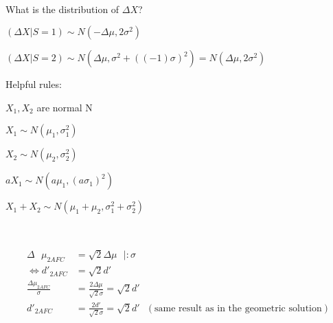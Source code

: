 \documentclass[../main/Notes.tex]{subfiles}
\begin{document}
\bigskip
\\
\begin{minipage}[t][3cm][t]{9.25cm}
What is the distribution of $\Delta X$?

$\left(\Delta X | S = 1\right) \sim N\left( -\Delta \mu , 2\sigma^{2}\right)$

$\left(\Delta X | S = 2\right) \sim N\left( \Delta \mu , \sigma^{2} + \left(\left( -1 \right)\sigma\right)^{2}\right) = N \left( \Delta \mu , 2\sigma^{2}\right)$
\end{minipage} 
\begin{minipage}[t][3cm][t]{6cm}
Helpful rules:

$X_{1},X_{2}$ are normal N

$X_{1} \sim N\left(\mu_{1} , \sigma_{1}^{2}\right)$

$X_{2} \sim N\left(\mu_{2} , \sigma_{2}^{2}\right)$

$aX_{1} \sim N\left(a\mu_{1} , \left(a\sigma_{1}\right)^{2}\right)$

$X_{1} + X_{2} \sim N \left( \mu_{1} + \mu_{2}, \sigma_{1}^{2} + \sigma_{2}^{2} \right)$
\end{minipage}
\\
\begin{minipage}[b][3cm][t]{3.5cm}
\end{minipage}
\begin{minipage}[b][3.5cm][t]{8cm}
\begin{align*}
& & \Delta ~~~\mu_{2AFC} & = \sqrt{2}\Delta\mu ~~~|:\sigma & &\\
& & \Leftrightarrow d'_{2AFC} & = \sqrt{2}d' & & \\
& & \frac{\Delta\mu_{2AFC}}{\sigma} & = \frac{2\Delta\mu}{\sqrt{2}\sigma} = \sqrt{2}d' & & \\
& & d'_{2AFC} & = \frac{2d'}{\sqrt{2}\sigma} = \sqrt{2}d' ~~~\left(\text{same result as in the geometric solution}\right) & &
\end{align*}
\end{minipage}
\end{document}
